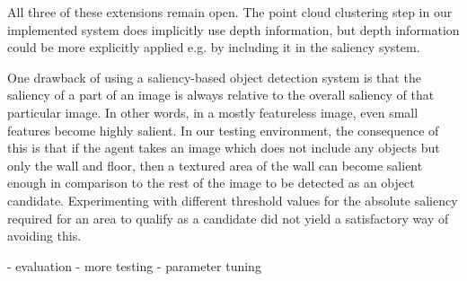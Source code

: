 All three of these extensions remain open.
The point cloud clustering step in our implemented system does implicitly use depth information, but depth information could be more explicitly applied e.g. by including it in the saliency system.

One drawback of using a saliency-based object detection system is that the saliency of a part of an image is always relative to the overall saliency of that particular image.
In other words, in a mostly featureless image, even small features become highly salient.
In our testing environment, the consequence of this is that if the agent takes an image which does not include any objects but only the wall and floor, then a textured area of the wall can become salient enough in comparison to the rest of the image to be detected as an object candidate.
Experimenting with different threshold values for the absolute saliency required for an area to qualify as a candidate did not yield a satisfactory way of avoiding this.


- evaluation
   - more testing
   - parameter tuning

